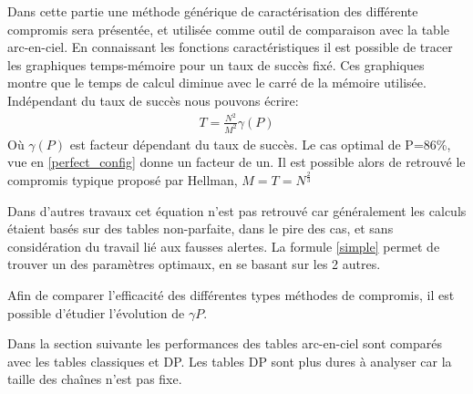	Dans cette partie une méthode générique de caractérisation des différente compromis sera présentée, et utilisée comme outil de comparaison avec la table arc-en-ciel.
	En connaissant les fonctions caractéristiques il est possible de tracer les graphiques temps-mémoire pour un taux de succès fixé. Ces graphiques montre que le temps de calcul diminue avec le carré de la mémoire utilisée.
	Indépendant du taux de succès nous pouvons écrire:
\begin{align*}\label{simple}
	T=\frac{N^2}{M^2}\gamma(P)
\end{align*}
	Où $\gamma(P)$ est facteur dépendant du taux de succès. Le cas optimal de P=86\%, vue en \ref{perfect_config} donne un facteur de un. Il est possible alors de retrouvé le compromis typique proposé par Hellman, $M=T=N^{\frac{2}{3}}$
	
	\bigskip

	Dans d'autres travaux cet équation n'est pas retrouvé car généralement les calculs étaient basés sur des tables non-parfaite, dans le pire des cas, et sans considération du travail lié aux fausses alertes. La formule \ref{simple} permet de trouver un des paramètres optimaux, en se basant sur les 2 autres.

	Afin de comparer l'efficacité des différentes types méthodes de compromis, il est possible d'étudier l'évolution de $\gamma{P}$.
	
	Dans la section suivante les performances des tables arc-en-ciel sont comparés avec les tables classiques et DP. Les tables DP sont plus dures à analyser car la taille des chaînes n'est pas fixe.

